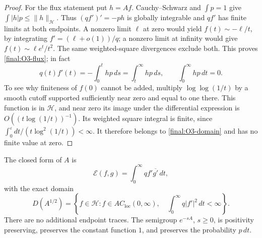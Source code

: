 \begin{proof}
For the flux statement put $h=Af$.  Cauchy--Schwarz and
$\int p=1$ give $\int|h|p\leq\|h\|_{\mathcal H}$.
Thus $(qf')'=-ph$ is globally integrable and $qf'$ has finite limits
at both endpoints.  A nonzero limit $\ell$ at zero would yield
$f(t)\sim-\ell/t$, by integrating $f'=(\ell+o(1))/q$;
a nonzero limit at infinity would give
$f(t)\sim\ell e^t/t^2$.  The same weighted-square divergences exclude
both.  This proves \eqref{final:O3-flux}; in fact
\[
 q(t)f'(t)=-\int_0^t hp\,ds=\int_t^\infty hp\,ds,
 \qquad \int_0^\infty hp\,dt=0.
\]
To see why finiteness of $f(0)$ cannot be added, multiply
$\log\log(1/t)$ by a smooth cutoff supported sufficiently near zero
and equal to one there.  This function is in $\mathcal H$, and near
zero its image under the differential expression is
$O((t\log(1/t))^{-1})$.  Its weighted square integral is finite,
since $\int_0^\varepsilon dt/(t\log^2(1/t))<\infty$.
It therefore belongs to \eqref{final:O3-domain} and has no finite
value at zero.
\end{proof}

\begin{proposition}
\label{final:O3-form}
The closed form of $A$ is
\[
 \mathcal E(f,g)=\int_0^\infty qf'\overline{g'}\,dt,
\]
with the exact domain
\begin{equation}\label{final:O3-form-domain}
 D(A^{1/2})=
 \left\{f\in\mathcal H:f\in AC_{\mathrm{loc}}(0,\infty),\quad
 \int_0^\infty q|f'|^2\,dt<\infty\right\}.
\end{equation}
There are no additional endpoint traces.  The semigroup $e^{-sA}$,
$s\geq0$, is positivity preserving, preserves the constant function
$1$, and preserves the probability $p\,dt$.
\end{proposition}

